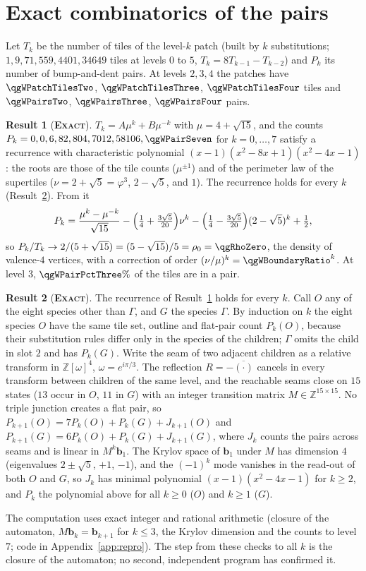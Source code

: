 \documentclass[11pt]{article}
\newcommand{\exact}{\textbf{\textsc{Exact}}}
\theoremstyle{definition}
\newtheorem{result}{Result}
\begin{document}
\section{Exact combinatorics of the pairs}\label{sec:pairs}
Let $T_k$ be the number of tiles of the level-$k$ patch (built by $k$ substitutions; $1,9,71,559,4401,34649$ tiles at levels $0$ to $5$, $T_k=8T_{k-1}-T_{k-2}$) and $P_k$ its number of bump-and-dent pairs. At levels $2,3,4$ the patches have $\qgWPatchTilesTwo$, $\qgWPatchTilesThree$, $\qgWPatchTilesFour$ tiles and $\qgWPairsTwo$, $\qgWPairsThree$, $\qgWPairsFour$ pairs.
\begin{result}[\exact]\label{res:found-pairs}
$T_k=A\mu^k+B\mu^{-k}$ with $\mu=4+\sqrt{15}$, and the counts $P_k=0,0,6,82,804,7012,58106,\qgWPairSeven$ for $k=0,\dots,7$ satisfy a recurrence with characteristic polynomial $(x-1)(x^2-8x+1)(x^2-4x-1)$: the roots are those of the tile counts ($\mu^{\pm1}$) and of the perimeter law of the supertiles ($\nu=2+\sqrt5=\varphi^3$, $2-\sqrt5$, and $1$). The recurrence holds for every $k$ (Result~\ref{res:found-pairs-proof}). From it
\[
P_k=\frac{\mu^k-\mu^{-k}}{\sqrt{15}}-\Bigl(\tfrac14+\tfrac{3\sqrt5}{20}\Bigr)\nu^k-\Bigl(\tfrac14-\tfrac{3\sqrt5}{20}\Bigr)(2-\sqrt5)^k+\tfrac12,
\]
so $P_k/T_k\to2/(5+\sqrt{15})=(5-\sqrt{15})/5=\rho_0=\qgRhoZero$, the density of valence-$4$ vertices, with a correction of order $(\nu/\mu)^k=\qgWBoundaryRatio^k$. At level $3$, $\qgWPairPctThree\%$ of the tiles are in a pair.
\end{result}
\begin{result}[\exact]\label{res:found-pairs-proof}
The recurrence of Result~\ref{res:found-pairs} holds for every $k$. Call $O$ any of the eight species other than $\Gamma$, and $G$ the species $\Gamma$. By induction on $k$ the eight species $O$ have the same tile set, outline and flat-pair count $P_k(O)$, because their substitution rules differ only in the species of the children; $\Gamma$ omits the child in slot $2$ and has $P_k(G)$. Write the seam of two adjacent children as a relative transform in $\mathbb{Z}[\omega]^4$, $\omega=e^{i\pi/3}$. The reflection $R=-\overline{(\cdot)}$ cancels in every transform between children of the same level, and the reachable seams close on $15$ states ($13$ occur in $O$, $11$ in $G$) with an integer transition matrix $M\in\mathbb{Z}^{15\times15}$. No triple junction creates a flat pair, so $P_{k+1}(O)=7P_k(O)+P_k(G)+J_{k+1}(O)$ and $P_{k+1}(G)=6P_k(O)+P_k(G)+J_{k+1}(G)$, where $J_k$ counts the pairs across seams and is linear in $M^k\mathbf b_1$. The Krylov space of $\mathbf b_1$ under $M$ has dimension $4$ (eigenvalues $2\pm\sqrt5$, $+1$, $-1$), and the $(-1)^k$ mode vanishes in the read-out of both $O$ and $G$, so $J_k$ has minimal polynomial $(x-1)(x^2-4x-1)$ for $k\ge2$, and $P_k$ the polynomial above for all $k\ge0$ ($O$) and $k\ge1$ ($G$).
\end{result}
The computation uses exact integer and rational arithmetic (closure of the automaton, $M\mathbf b_k=\mathbf b_{k+1}$ for $k\le3$, the Krylov dimension and the counts to level $7$; code in Appendix~\ref{app:repro}). The step from these checks to all $k$ is the closure of the automaton; no second, independent program has confirmed it.
\end{document}

